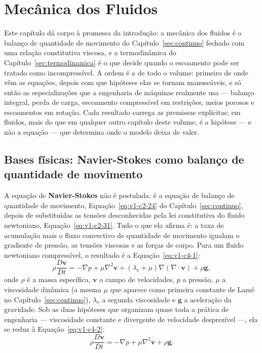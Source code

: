 \documentclass[12pt,a4paper]{article}
\numberwithin{equation}{section}
\numberwithin{table}{section}
\numberwithin{figure}{section}
\begin{document}
\section{Mecânica dos Fluidos}\label{sec:fluidos}

Este capítulo dá corpo à promessa da introdução: a mecânica dos fluidos é o
balanço de quantidade de movimento do Capítulo~\ref{sec:continuo} fechado com
uma relação constitutiva viscosa, e a termodinâmica do
Capítulo~\ref{sec:termodinamica} é o que decide quando o escoamento pode ser
tratado como incompressível. A ordem é a de todo o volume: primeiro de onde
vêm as equações, depois com que hipóteses elas se tornam manuseáveis, e só
então as especializações que a engenharia de máquinas realmente usa --- balanço
integral, perda de carga, escoamento compressível em restrições, meios porosos
e escoamentos em rotação. Cada resultado carrega as premissas explícitas: em
fluidos, mais do que em qualquer outro capítulo deste volume, é a hipótese ---
e não a equação --- que determina onde o modelo deixa de valer.

\subsection{Bases físicas: Navier-Stokes como balanço de quantidade de
movimento}\label{sub:v1-c4-bases}

A equação de \textbf{Navier-Stokes} não é postulada: é a equação de balanço de
quantidade de movimento, Equação~\eqref{eq:v1-c2-24} do
Capítulo~\ref{sec:continuo}, depois de substituídas as tensões desconhecidas
pela lei constitutiva do fluido newtoniano, Equação~\eqref{eq:v1-c2-31}. Tudo
o que ela afirma é: a taxa de acumulação mais o fluxo convectivo de quantidade
de movimento igualam o gradiente de pressão, as tensões viscosas e as forças
de corpo. Para um fluido newtoniano compressível, o resultado é a
Equação~\eqref{eq:v1-c4-1}:
\begin{equation}\label{eq:v1-c4-1}
\rho\frac{D\mathbf{v}}{Dt} = -\nabla p + \mu\nabla^2\mathbf{v} +
\left(\lambda_v + \mu\right)\nabla\left(\nabla\cdot\mathbf{v}\right) + \rho\mathbf{g},
\end{equation}
onde $\rho$ é a massa específica, $\mathbf{v}$ o campo de velocidades, $p$ a
pressão, $\mu$ a viscosidade dinâmica (a mesma $\mu$ que aparece como primeira
constante de Lamé no Capítulo~\ref{sec:continuo}), $\lambda_v$ a segunda
viscosidade e $\mathbf{g}$ a aceleração da gravidade. Sob as duas hipóteses
que organizam quase toda a prática de engenharia --- viscosidade constante e
divergente de velocidade desprezível ---, ela se reduz à
Equação~\eqref{eq:v1-c4-2}:
\begin{equation}\label{eq:v1-c4-2}
\rho\frac{D\mathbf{v}}{Dt} = -\nabla p + \mu\nabla^2\mathbf{v} + \rho\mathbf{g}.
\end{equation}
\end{document}
